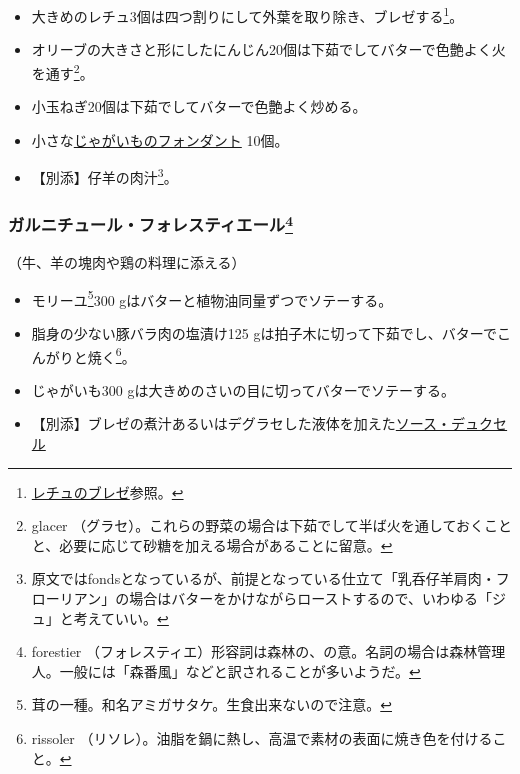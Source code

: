 \begin{recette}
\begin{itemize}
\item
  大きめのレチュ3個は四つ割りにして外葉を取り除き、ブレゼする\footnote{\protect\hyperlink{laitue-braisee}{レチュのブレゼ}参照。}。
\item
  オリーブの大きさと形にしたにんじん20個は下茹でしてバターで色艶よく火を通す\footnote{glacer
    （グラセ）。これらの野菜の場合は下茹でして半ば火を通しておくことと、必要に応じて砂糖を加える場合があることに留意。}。
\item
  小玉ねぎ20個は下茹でしてバターで色艶よく炒める。
\item
  小さな\protect\hyperlink{pommes-de-terre-fondantes}{じゃがいものフォンダント}
  10個。
\item
  【別添】仔羊の肉汁\footnote{原文ではfondsとなっているが、前提となっている仕立て「乳呑仔羊肩肉・フローリアン」の場合はバターをかけながらローストするので、いわゆる「ジュ」と考えていい。}。
\end{itemize}

\atoaki{}

\hypertarget{garniture-forestiere}{%
\subsubsection[ガルニチュール・フォレスティエール]{\texorpdfstring{ガルニチュール・フォレスティエール\footnote{forestier
  （フォレスティエ）形容詞は森林の、の意。名詞の場合は森林管理人。一般には「森番風」などと訳されることが多いようだ。}}{ガルニチュール・フォレスティエール}}\label{garniture-forestiere}}



（牛、羊の塊肉や鶏の料理に添える）

\begin{itemize}
\item
  モリーユ\footnote{茸の一種。和名アミガサタケ。生食出来ないので注意。}300
  gはバターと植物油同量ずつでソテーする。
\item
  脂身の少ない豚バラ肉の塩漬け125
  gは拍子木に切って下茹でし、バターでこんがりと焼く\footnote{rissoler
    （リソレ）。油脂を鍋に熱し、高温で素材の表面に焼き色を付けること。}。
\item
  じゃがいも300 gは大きめのさいの目に切ってバターでソテーする。
\item
  【別添】ブレゼの煮汁あるいはデグラセした液体を加えた\protect\hyperlink{sauce-duxelles}{ソース・デュクセル}
\end{itemize}


\end{recette}
